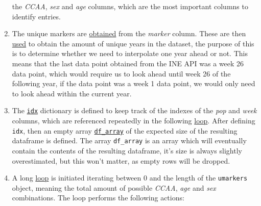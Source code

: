 \documentclass[
  a4paper]{article}
\begin{document}
\begin{enumerate}
  the \emph{CCAA}, \emph{sex} and \emph{age} columns, which are the most
  important columns to identify entries.
\item
  The unique markers are
  \href{https://github.com/dreth/tfm_uc3m/blob/report_ref/api/functions.py\#L313}{obtained}
  from the \emph{marker} column. These are then
  \href{https://github.com/dreth/tfm_uc3m/blob/report_ref/api/functions.py\#L315-L321}{used}
  to obtain the amount of unique years in the dataset, the purpose of
  this is to determine whether we need to interpolate one year ahead or
  not. This means that the last data point obtained from the INE API was
  a week 26 data point, which would require us to look ahead until week
  26 of the following year, if the data point was a week 1 data point,
  we would only need to look ahead within the current year.
\item
  The
  \href{https://github.com/dreth/tfm_uc3m/blob/report_ref/api/functions.py\#L324-L327}{\texttt{idx}}
  dictionary is defined to keep track of the indexes of the \emph{pop}
  and \emph{week} columns, which are referenced repeatedly in the
  following
  \href{https://github.com/dreth/tfm_uc3m/blob/report_ref/api/functions.py\#L335}{loop}.
  After defining \texttt{idx}, then an empty array
  \href{https://github.com/dreth/tfm_uc3m/blob/report_ref/api/functions.py\#L332}{\texttt{df\_array}}
  of the expected size of the resulting dataframe is defined. The array
  \texttt{df\_array} is an array which will eventually contain the
  contents of the resulting dataframe, it's size is always slightly
  overestimated, but this won't matter, as empty rows will be dropped.
\item
  A long
  \href{https://github.com/dreth/tfm_uc3m/blob/report_ref/api/functions.py\#L335-L419}{loop}
  is initiated iterating between 0 and the length of the
  \texttt{umarkers} object, meaning the total amount of possible
  \emph{CCAA}, \emph{age} and \emph{sex} combinations. The loop performs
  the following actions:


\end{enumerate}
\end{document}
